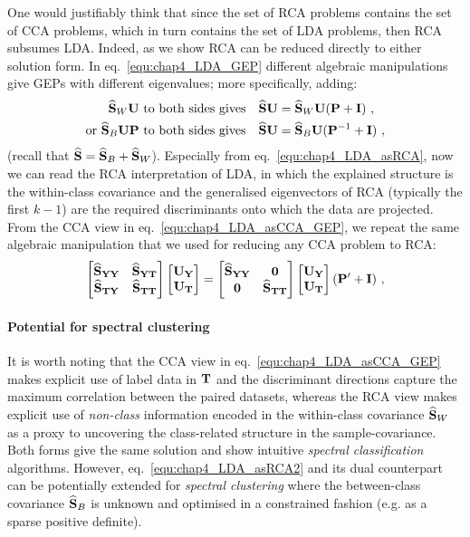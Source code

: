       One would justifiably think that since the set of RCA problems contains the set of CCA problems, which in turn contains the set of LDA problems, then RCA subsumes LDA. Indeed, as we show RCA can be reduced directly to either solution form. In eq.~\eqref{equ:chap4_LDA_GEP} different algebraic manipulations give GEPs with different eigenvalues; more specifically, adding:
      \begin{align}
	\label{equ:chap4_LDA_asRCA} \widehat{\mathbf{S}}_W \mathbf{U} ~\textrm{to both sides gives} \quad \widehat{\mathbf{S}} \mathbf{U} &= \widehat{\mathbf{S}}_W \mathbf{U} ( \mathbf{P} + \mathbf{I} ) ~,\\
	\label{equ:chap4_LDA_asRCA2} \textrm{or}~\widehat{\mathbf{S}}_B \mathbf{U} \mathbf{P} ~ \textrm{to both sides gives} \quad \widehat{\mathbf{S}} \mathbf{U} &= \widehat{\mathbf{S}}_B \mathbf{U} ( \mathbf{P}^{-1} + \mathbf{I} ) ~,
      \end{align}
      (recall that $\widehat{\mathbf{S}} = \widehat{\mathbf{S}}_B + \widehat{\mathbf{S}}_W$). Especially from eq.~\eqref{equ:chap4_LDA_asRCA}, now we can read the RCA interpretation of LDA, in which the explained structure is the within-class covariance and the generalised eigenvectors of RCA (typically the first $k-1$) are the required discriminants onto which the data are projected. From the CCA view in eq.~\eqref{equ:chap4_LDA_asCCA_GEP}, we repeat the same algebraic manipulation that we used for reducing any CCA problem to RCA:
      \begin{equation*} \label{equ:chap4_LDA_asRCAfromCCA}
	\begin{bmatrix}  \widehat{\mathbf{S}}_{\mathbf{Y}\mathbf{Y}} & \widehat{\mathbf{S}}_{\mathbf{Y}\mathbf{T}} \\ \widehat{\mathbf{S}}_{\mathbf{T}\mathbf{Y}} & \widehat{\mathbf{S}}_{\mathbf{T}\mathbf{T}}  \end{bmatrix} \begin{bmatrix}  \mathbf{U}_{\mathbf{Y}} \\ \mathbf{U}_{\mathbf{T}}  \end{bmatrix}
	= \begin{bmatrix}  \widehat{\mathbf{S}}_{\mathbf{Y}\mathbf{Y}} &\mathbf{0} \\ \mathbf{0} &\widehat{\mathbf{S}}_{\mathbf{T}\mathbf{T}}  \end{bmatrix} \begin{bmatrix}  \mathbf{U}_{\mathbf{Y}} \\ \mathbf{U}_{\mathbf{T}}  \end{bmatrix} ( \mathbf{P}^\prime + \mathbf{I}) ~,
      \end{equation*}

    \paragraph{Potential for spectral clustering}
    It is worth noting that the CCA view in eq.~\eqref{equ:chap4_LDA_asCCA_GEP} makes explicit use of label data in $\mathbf{T}$ and the discriminant directions capture the maximum correlation between the paired datasets, whereas the RCA view makes explicit use of \textit{non-class} information encoded in the within-class covariance $\widehat{\mathbf{S}}_W$ as a proxy to uncovering the class-related structure in the sample-covariance. Both forms give the same solution and show intuitive \textit{spectral classification} algorithms. However, eq.~\eqref{equ:chap4_LDA_asRCA2} and its dual counterpart can be potentially extended for \textit{spectral clustering} \citep{Ng:spectral02,Kannan:clusterings04, Azar:spectral01} where the between-class covariance $\widehat{\mathbf{S}}_B$ is unknown and optimised in a constrained fashion (e.g. as a sparse positive definite). %


